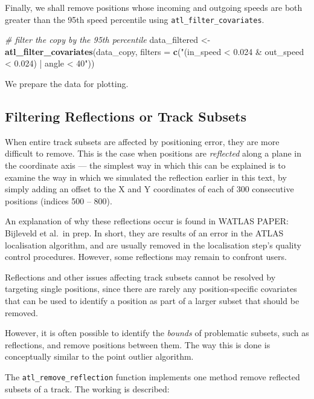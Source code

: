 \documentclass[
]{scrreprt}
\newenvironment{Shaded}{}{}
\newcommand{\CommentTok}[1]{\textcolor[rgb]{0.38,0.63,0.69}{\textit{#1}}}
\newcommand{\DataTypeTok}[1]{\textcolor[rgb]{0.56,0.13,0.00}{#1}}
\newcommand{\KeywordTok}[1]{\textcolor[rgb]{0.00,0.44,0.13}{\textbf{#1}}}
\newcommand{\NormalTok}[1]{#1}
\newcommand{\StringTok}[1]{\textcolor[rgb]{0.25,0.44,0.63}{#1}}
\begin{document}
Finally, we shall remove positions whose incoming and outgoing speeds are both greater than the 95th speed percentile using \texttt{atl\_filter\_covariates}.

\begin{Shaded}
\begin{Highlighting}[]
\CommentTok{\# filter the copy by the 95th percentile}
\NormalTok{data\_filtered <{-}}\StringTok{ }\KeywordTok{atl\_filter\_covariates}\NormalTok{(data\_copy,}
    \DataTypeTok{filters =} \KeywordTok{c}\NormalTok{(}\StringTok{"(in\_speed < 0.024 \& out\_speed < 0.024) | angle < 40"}\NormalTok{))}
\end{Highlighting}
\end{Shaded}

We prepare the data for plotting.

\hypertarget{filtering-reflections-or-track-subsets}{%
\subsection{Filtering Reflections or Track Subsets}\label{filtering-reflections-or-track-subsets}}

When entire track subsets are affected by positioning error, they are more difficult to remove. This is the case when positions are \emph{reflected} along a plane in the coordinate axis --- the simplest way in which this can be explained is to examine the way in which we simulated the reflection earlier in this text, by simply adding an offset to the X and Y coordinates of each of 300 consecutive positions (indices 500 -- 800).

An explanation of why these reflections occur is found in WATLAS PAPER: Bijleveld et al.~in prep. In short, they are results of an error in the ATLAS localisation algorithm, and are usually removed in the localisation step's quality control procedures. However, some reflections may remain to confront users.

Reflections and other issues affecting track subsets cannot be resolved by targeting single positions, since there are rarely any position-specific covariates that can be used to identify a position as part of a larger subset that should be removed.

However, it is often possible to identify the \emph{bounds} of problematic subsets, such as reflections, and remove positions between them. The way this is done is conceptually similar to the point outlier algorithm.

The \texttt{atl\_remove\_reflection} function implements one method remove reflected subsets of a track. The working is described:
\end{document}
